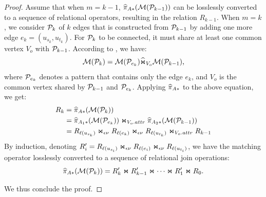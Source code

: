 {\begin{proof}
Assume that when $m = k-1$, $\widehat{\pi}_{A*}(\mathcal{M}(\mathcal{P}_{k-1}))$ can be losslessly converted to a sequence of relational operators, resulting in the relation $R_{k-1}$. When $m = k$, we consider $\mathcal{P}_{k}$ of $k$ edges that is constructed from $\mathcal{P}_{k-1}$ by adding one more edge $e_k = (u_{s_k}, u_{t_k})$. For $\mathcal{P}_{k}$ to be connected, it must share at least one common vertex $V_o$ with $\mathcal{P}_{k-1}$. According to , we have:
\[ \mathcal{M}(\mathcal{P}_{k}) =  \mathcal{M}(\mathcal{P}_{e_k}) \widehat{\Join}_{V_o} \mathcal{M}(\mathcal{P}_{k-1}), \]
where $\mathcal{P}_{e_k}$ denotes a pattern that contains only the edge $e_k$, and $V_o$ is the common vertex shared by $\mathcal{P}_{k-1}$ and $\mathcal{P}_{e_k}$. Applying $\widehat{\pi}_{A*}$ to the above equation, we get:
\begin{equation*}
\begin{split}
R_k &= \widehat{\pi}_{A*}(\mathcal{M}(\mathcal{P}_{k})) \\
    &= \widehat{\pi}_{A_1*}(\mathcal{M}(\mathcal{P}_{e_k})) \Join_{V_o.attr}  \widehat{\pi}_{A_2*}(\mathcal{M}(\mathcal{P}_{k-1})) \\
    &= {R_{\mathcal{\ell}(u_{s_k})}} \Join_{\epsilon\nu} {R_{\mathcal{\ell}(e_k)}} \Join_{\epsilon\nu} {R_{\mathcal{\ell}(u_{t_k})}} \Join_{V_o.attr} R_{k-1}
\end{split}
\end{equation*}
By induction, denoting $R'_i = {R_{\mathcal{\ell}(u_{s_i})}} \Join_{\epsilon\nu} {R_{\mathcal{\ell}(e_i)}} \Join_{\epsilon\nu} {R_{\mathcal{\ell}(u_{t_i})}}$, we have the matching operator losslessly converted to a sequence of relational join operations:
\begin{equation}
    \label{eq:graph-agnostic}
    \widehat{\pi}_{A*}(\mathcal{M}(\mathcal{P}_{k})) = R'_k \Join R'_{k-1} \Join \cdots \Join R'_1 \Join R_0.
\end{equation}

We thus conclude the proof.
\end{proof}
}



